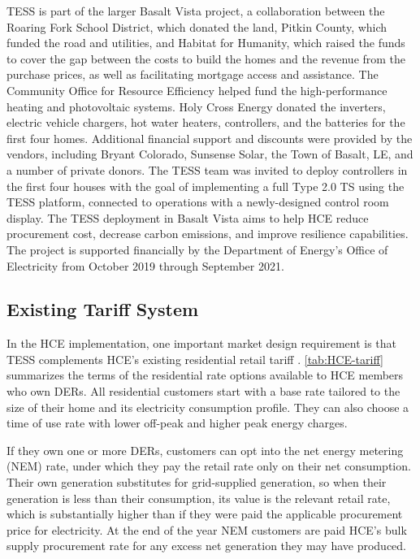 \documentclass[12pt]{article}{Definitions/mdpi}
\begin{document}
TESS is part of the larger Basalt Vista project, a collaboration between the Roaring Fork School District, which donated the land, Pitkin County, which funded the road and utilities, and Habitat for Humanity, which raised the funds to cover the gap between the costs to build the homes and the revenue from the purchase prices, as well as facilitating mortgage access and assistance.  The Community Office for Resource Efficiency helped fund the high-performance heating and photovoltaic systems. Holy Cross Energy donated the inverters, electric vehicle chargers, hot water heaters, controllers, and the batteries for the first four homes.  Additional financial support and discounts were provided by the vendors, including Bryant Colorado, Sunsense Solar, the Town of Basalt, LE, and a number of private donors. The TESS team was invited to deploy controllers in the first four houses with the goal of implementing a full Type 2.0 TS using the TESS platform, connected to operations with a newly-designed control room display. The TESS deployment in Basalt Vista aims to help HCE reduce procurement cost, decrease carbon emissions, and improve resilience capabilities. The project is supported financially by the Department of Energy's Office of Electricity from October 2019 through September 2021.

\subsection{Existing Tariff System}\label{sec:HCE_tariff}

In the HCE implementation, one important market design requirement is that TESS complements HCE's existing residential retail tariff \citep{holy_cross_energy_electric_2020}.
\cref{tab:HCE-tariff} summarizes the terms of the residential rate options available to HCE members who own DERs. All residential customers start with a base rate tailored to the size of their home and its electricity consumption profile. They can also choose a time of use rate with lower off-peak and higher peak energy charges. 



If they own one or more DERs, customers can opt into the net energy metering (NEM) rate, under which they pay the retail rate only on their net consumption. Their own generation substitutes for grid-supplied generation, so when their generation is less than their consumption, its value is the relevant retail rate, which is substantially higher than if they were paid the applicable procurement price for electricity. At the end of the year NEM customers are paid HCE's bulk supply procurement rate for any excess net generation they may have produced.
\end{document}
